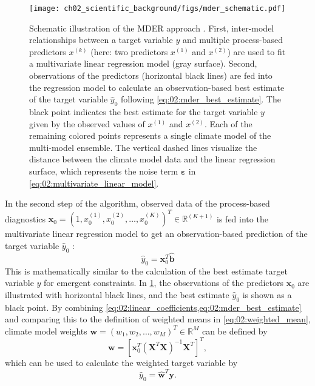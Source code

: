 \begin{figure}[t]
  \centering
  \texttt{[image: 
    ch02\_scientific\_background/figs/mder\_schematic.pdf]}
  \caption[
    Schematic illustration of the \acf{MDER} approach.
  ]{
    Schematic illustration of the \acf{MDER} approach \autocite{Karpechko2013}.
    First, inter-model relationships between a target variable $y$ and multiple
    process-based predictors $x^{(k)}$ (here: two predictors $x^{(1)}$ and
    $x^{(2)}$) are used to fit a multivariate linear regression model (gray
    surface). Second, observations of the predictors (horizontal black lines)
    are fed into the regression model to calculate an observation-based best
    estimate of the target variable $\hat{y}_0$ following
    \cref{eq:02:mder_best_estimate}. The black point indicates the best
    estimate for the target variable $y$ given by the observed values of
    $x^{(1)}$ and $x^{(2)}$. Each of the remaining colored points represents a
    single climate model of the multi-model ensemble. The vertical dashed lines
    visualize the distance between the climate model data and the linear
    regression surface, which represents the noise term $\bm{\varepsilon}$ in
    \cref{eq:02:multivariate_linear_model}.
  }
  \label{fig:02:mder}
\end{figure}

In the second step of the algorithm, observed data of the process-based
diagnostics $\bm{x}_0 = \left( 1, x_0^{(1)}, x_0^{(2)}, \ldots, x_0^{(K)}
\right)^T \in \mathbb{R}^{(K + 1)}$ is fed into the multivariate linear
regression model to get an observation-based prediction of the target variable
$\hat{y}_0$
\autocite{Karpechko2013}:
\begin{equation}
  \hat{y}_0 = \bm{x}_0^T \hat{\bm{b}}
  \label{eq:02:mder_best_estimate}
\end{equation}
This is mathematically similar to the calculation of the best estimate target
variable $y$ for emergent constraints. In \cref{fig:02:mder}, the observations
of the predictors $\bm{x}_0$ are illustrated with horizontal black lines, and
the best estimate $\hat{y}_0$ is shown as a black point. By combining
\cref{eq:02:linear_coefficients,eq:02:mder_best_estimate} and comparing this to
the definition of weighted means in \cref{eq:02:weighted_mean}, climate model
weights $\bm{w} = \left( w_1, w_2, \ldots, w_M \right)^T \in \mathbb{R}^M$ can
be defined by
\begin{equation}
  \bm{w} = \left[ \bm{x}_0^T \left( \bm{X}^T \bm{X} \right)^{-1} \bm{X}^T
  \right]^T,
  \label{eq:02:mder_weights}
\end{equation}
which can be used to calculate the weighted target variable by
\begin{equation}
  \hat{y}_0 = \hat{\bm{w}}^T \bm{y}.
  \label{eq:02:weighted_mean_vector}
\end{equation}


